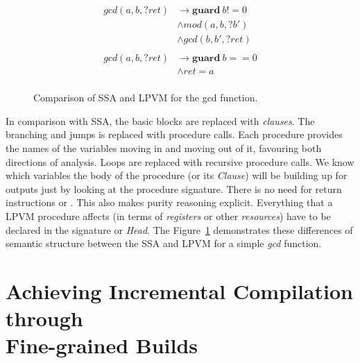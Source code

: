 \begin{figure}
  \begin{minipage}{.5\textwidth}
  \end{minipage}
  \begin{minipage}{.5\textwidth}
    \begin{align*}
      gcd(a,b,?ret) &\rightarrow \mathbf{guard}\ b != 0 \\
                    &\wedge mod(a,b,?b') \\
                    &\wedge gcd(b,b',?ret) \\
      \\
      gcd(a,b,?ret) &\rightarrow \mathbf{guard}\ b == 0 \\
      &\wedge ret=a \\
    \end{align*}
  \end{minipage}
  \caption{Comparison of SSA and LPVM for the gcd function.}
  \label{fig:gcd_ssa_lpvm}
\end{figure}



In comparison with SSA, the basic blocks are replaced with \textit{clauses}.
The branching and jumps is replaced with procedure calls. Each procedure
provides the names of the variables moving in and moving out of it, favouring
both directions of analysis. Loops are replaced with recursive procedure
calls. We know which variables the body of the procedure (or its
\textit{Clause}) will be building up for outputs just by looking at the
procedure signature. There is no need for return instructions or \phifs. This
also makes purity reasoning explicit. Everything that a LPVM procedure affects
(in terms of \textit{registers} or other \textit{resources}) have to be
declared in the signature or \textit{Head}. The Figure~\ref{fig:gcd_ssa_lpvm}
demonstrates these differences of semantic structure between the SSA and LPVM
for a simple \textit{gcd} function.



\section{Achieving Incremental Compilation through\\ Fine-grained Builds
  \citep{cpp_compiler}}
\label{sec:cpp_compiler}

